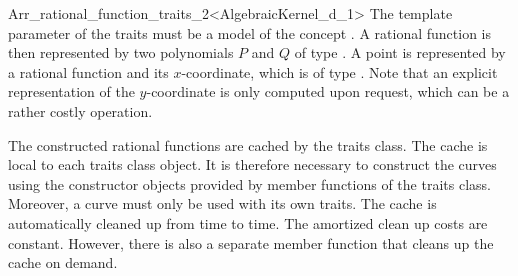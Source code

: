 \begin{ccRefClass}{Arr_rational_function_traits_2<AlgebraicKernel_d_1>}
The template parameter of the traits must be a model of the 
concept . 
A rational function is then represented by two polynomials $P$ and $Q$ of type 
. 
A point is represented by a rational function and its $x$-coordinate, which is 
of type . 
Note that an explicit representation of the $y$-coordinate is only computed upon 
request, which can be a rather costly operation. 


The constructed rational functions are cached by the traits class. 
The cache is local to each traits class object. 
It is therefore necessary to construct the curves using the constructor 
objects provided by member functions of the traits class. 
Moreover, a curve must only be used with its own traits. 
The cache is automatically  cleaned up from time to time.
The amortized clean up costs are constant. However, there is also a 
separate member function that cleans up the cache on demand.  



\ccIsModel
  \\
  \\

\ccTypes {} 
\ccGlue
{}\ccGlue
{}\ccGlue
{}\ccGlue
{}




\end{ccRefClass}
